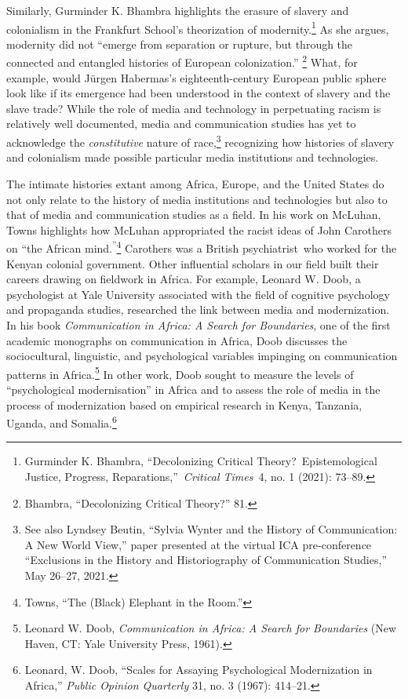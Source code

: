 \documentclass{tufte-handout}
\begin{document}
Similarly, Gurminder K. Bhambra highlights the erasure of slavery and
colonialism in the Frankfurt School's theorization of
modernity.\footnote{Gurminder K. Bhambra, ``Decolonizing Critical
  Theory?~Epistemological Justice, Progress,
  Reparations,''~\emph{Critical Times}~4, no. 1 (2021): 73--89.} As she
argues, modernity did not ``emerge from separation or rupture, but
through the connected and entangled histories of European
colonization.'' \footnote{Bhambra, ``Decolonizing Critical Theory?'' 81.}
What, for example, would Jürgen Habermas's eighteenth-century European
public sphere look like if its emergence had been understood in the
context of slavery and the slave trade? While the role of media and
technology in perpetuating racism is relatively well documented, media
and communication studies has yet to acknowledge the \emph{constitutive}
nature of race,\footnote{See also Lyndsey Beutin, ``Sylvia Wynter and
  the History of Communication: A New World View,'' paper presented at
  the virtual ICA pre-conference ``Exclusions in the History and
  Historiography of Communication Studies,'' May 26--27, 2021.}
recognizing how histories of slavery and colonialism made possible
particular media institutions and technologies.

The intimate histories extant among Africa, Europe, and the United
States do not only relate to the history of media institutions and
technologies but also to that of media and communication studies as a
field. In his work on McLuhan, Towns highlights how McLuhan appropriated
the racist ideas of John Carothers on ``the African
mind.\textsuperscript{''}\footnote{Towns, ``The (Black) Elephant in the
  Room.''} Carothers was a British psychiatrist~who worked for the
Kenyan colonial government. Other influential scholars in our field
built their careers drawing on fieldwork in Africa. For example, Leonard
W. Doob, a psychologist at Yale University associated with the field of
cognitive psychology and propaganda studies, researched the link between
media and modernization. In his book \emph{Communication in Africa: A
Search for Boundaries}, one of the first academic monographs on
communication in Africa, Doob discusses the sociocultural, linguistic,
and psychological variables impinging on communication patterns in
Africa.\footnote{Leonard W. Doob, \emph{Communication in Africa: A
  Search for Boundaries} (New Haven, CT: Yale University Press, 1961).}
In other work, Doob sought to measure the levels of ``psychological
modernisation'' in Africa and to assess the role of media in the process
of modernization based on empirical research in Kenya, Tanzania, Uganda,
and Somalia.\footnote{Leonard, W. Doob, ``Scales for Assaying
  Psychological Modernization in Africa,'' \emph{Public Opinion
  Quarterly} 31, no. 3 (1967): 414--21.}
\end{document}
